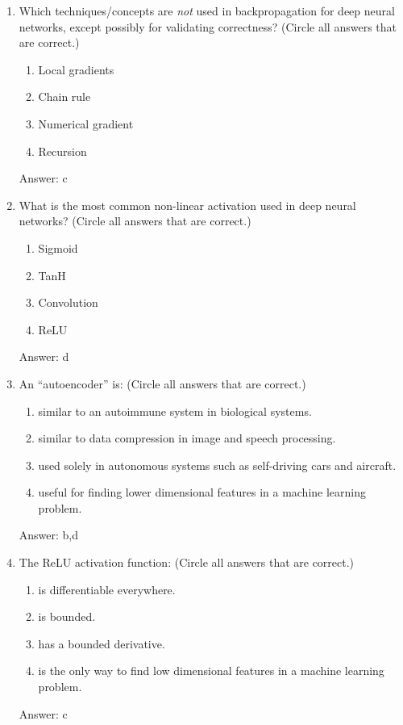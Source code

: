 \documentclass[11pt]{report}
\begin{document}
\begin{enumerate}
\item
Which techniques/concepts are {\em not} used in backpropagation for deep neural networks, except possibly for validating correctness? (Circle all answers that are correct.)
\begin{enumerate}
\item  Local gradients
\item  Chain rule
\item  Numerical gradient
\item  Recursion
\end{enumerate}
\begin{mdframed}
Answer: c
\end{mdframed}
\item
What is the most common non-linear activation used in deep neural networks? (Circle all answers that are correct.)
\begin{enumerate}
\item  Sigmoid
\item  TanH
\item  Convolution
\item  ReLU
\end{enumerate}
\begin{mdframed}
Answer: d
\end{mdframed}
\item
An ``autoencoder'' is: (Circle all answers that are correct.)
\begin{enumerate}
\item  similar to an autoimmune system in biological systems.
\item similar to data compression in image and speech processing.
\item used solely in autonomous systems such as self-driving cars and aircraft.
\item  useful for finding lower dimensional features in a machine learning problem.
\end{enumerate}
\begin{mdframed}
Answer: b,d
\end{mdframed}
\item
The ReLU activation function: (Circle all answers that are correct.)
\begin{enumerate}
\item is differentiable everywhere.
\item is bounded.
\item has a bounded derivative.
\item  is the only way to find low dimensional features in a machine learning problem.
\end{enumerate}
\begin{mdframed}
Answer: c
\end{mdframed}


\end{enumerate}
\end{document}
